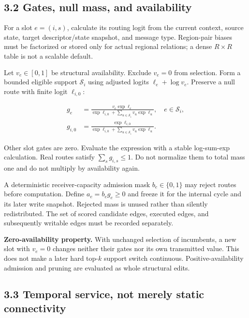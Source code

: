 \documentclass[
  11pt,
  a4paper,
]{article}
\begin{document}
\subsection{3.2 Gates, null mass, and
availability}\label{gates-null-mass-and-availability}

For a slot \(e=(i,s)\), calculate its routing logit from the current
context, source state, target descriptor/state snapshot, and message
type. Region-pair biases must be factorized or stored only for actual
regional relations; a dense \(R\times R\) table is not a scalable
default.

Let \(v_e\in[0,1]\) be structural availability. Exclude \(v_e=0\) from
selection. Form a bounded eligible support \(\mathcal S_i\) using
adjusted logits \(\ell_e+\log v_e\). Preserve a null route with finite
logit \(\ell_{i,0}\):

\[
\begin{aligned}
g_e&=\frac{v_e\exp\ell_e}{\exp\ell_{i,0}
+\sum_{u\in\mathcal S_i}v_u\exp\ell_u},\quad e\in\mathcal S_i,\\
g_{i,0}&=\frac{\exp\ell_{i,0}}{\exp\ell_{i,0}
+\sum_{u\in\mathcal S_i}v_u\exp\ell_u}.
\end{aligned}
\tag{7}
\]

Other slot gates are zero. Evaluate the expression with a stable
log-sum-exp calculation. Real routes satisfy \(\sum_s g_{i,s}\le1\). Do
not normalize them to total mass one and do not multiply by availability
again.

A deterministic receiver-capacity admission mask \(b_e\in\{0,1\}\) may
reject routes before computation. Define \(a_e=b_e g_e\ge0\) and freeze
it for the internal cycle and its later write snapshot. Rejected mass is
unused rather than silently redistributed. The set of scored candidate
edges, executed edges, and subsequently writable edges must be recorded
separately.

\textbf{Zero-availability property.} With unchanged selection of
incumbents, a new slot with \(v_e=0\) changes neither their gates nor
its own transmitted value. This does not make a later hard top-\(k\)
support switch continuous. Positive-availability admission and pruning
are evaluated as whole structural edits.

\subsection{3.3 Temporal service, not merely static
connectivity}\label{temporal-service-not-merely-static-connectivity}
\end{document}
